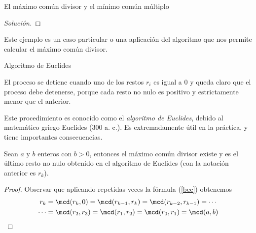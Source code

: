 \begin{section}{El máximo común divisor y el mínimo común
múltiplo}
\begin{proof}[Solución]
\end{proof}

Este ejemplo es un caso particular o una aplicación del algoritmo que nos permite calcular el máximo común divisor.





\begin{table}[htbp]
\centering
{}
\caption{Algoritmo de Euclides}
\label{tabla-AE}
\end{table}

El proceso se detiene cuando uno de los restos $r_i$  es igual a $0$ y queda claro que el proceso debe detenerse, porque cada resto no nulo es positivo y estrictamente menor que el anterior.

Este procedimiento es conocido como el \textit{algoritmo de Euclides}, debido al matemático griego Euclides ($300$ a. c.). Es extremadamente útil en la práctica, y tiene importantes consecuencias.


\begin{teorema} Sean  $a$ y $b$ enteros con $b >0$, entonces el máximo común divisor existe y es el último resto no nulo obtenido en el algoritmo de Euclides (con la notación anterior es $r_k$). 
\end{teorema}
\begin{proof}
Observar que aplicando repetidas veces la fórmula (\ref{bec}) obtenemos 
\begin{multline*}
r_k = \mcd(r_{k},0) = \mcd(r_{k-1},r_k) =\mcd(r_{k-2},r_{k-1}) = \cdots\\\cdots 
=  \mcd(r_2,r_3) =  \mcd(r_1,r_2)  =  \mcd(r_0,r_1) = \mcd(a,b)  
\end{multline*}
\end{proof}



\end{section}
